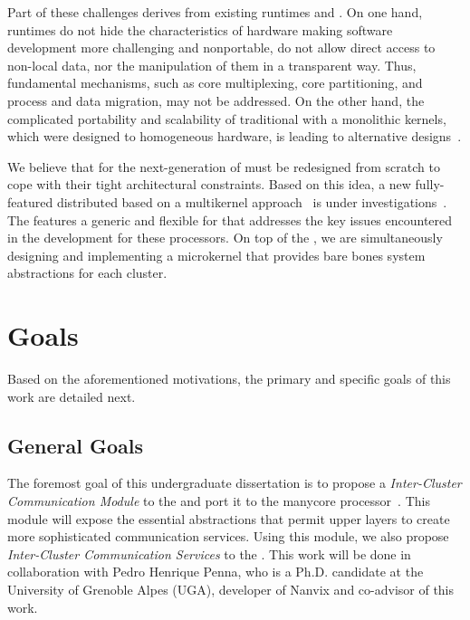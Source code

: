 	Part of these challenges derives from existing runtimes and \oss.
	On one hand, runtimes do not hide the characteristics of hardware
	making software development more challenging and nonportable, \eg do
	not allow direct access to non-local data, nor the manipulation of
	them in a transparent way.  Thus, fundamental \os mechanisms, such
	as core multiplexing, core partitioning, and process and data
	migration, may not be addressed.  On the other hand, the complicated
	portability and scalability of traditional \oss with a monolithic
	kernels, which were designed to homogeneous hardware, is leading to
	alternative \os designs~\cite{Baumann2009, kluge2014,
		nightingale2009, rhoden2011}.

	We believe that \oss for the next-generation of \lightweight
	\manycores must be redesigned from scratch to cope with their tight
	architectural constraints.  Based on this idea, a new fully-featured
	distributed \os based on a multikernel approach~\cite{Baumann2009}
	is under investigations~\cite{penna2017-1,penna2017-2,penna2019}.
	The \nanvix \multikernel features a generic and flexible \hal for
	\lightweight \manycores that addresses the key issues encountered in
	the development for these processors.  On top of the \nanvix
	\textit{\hal}, we are simultaneously designing and implementing a
	microkernel that provides bare bones system abstractions for each
	cluster.

\section{Goals}
\label{sec.goals}

	Based on the aforementioned motivations, the primary and specific
	goals of this work are detailed next.

\subsection{General Goals}
\label{sec.goals.general}

	The foremost goal of this undergraduate dissertation is to propose a
	\textit{Inter-Cluster Communication Module} to the \nanvix
	\textit{\hal} and port it to the \mppa manycore
	processor~\cite{DeDinechin2013-1}.  This module will expose the
	essential abstractions that permit upper layers to create more
	sophisticated communication services.  Using this module, we also
	propose \textit{Inter-Cluster Communication Services} to the \nanvix
	\microkernel.  This work will be done in collaboration with Pedro
	Henrique Penna, who is a Ph.D. candidate at the University of
	Grenoble Alpes (UGA), developer of Nanvix and co-advisor of this
	work.

